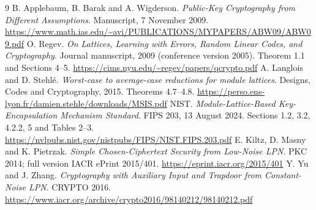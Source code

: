 \documentclass[11pt,a4paper]{article}
\begin{document}
\begin{thebibliography}{9}
 B. Applebaum, B. Barak and A. Wigderson. \emph{Public-Key Cryptography from Different Assumptions}. Manuscript, 7 November 2009.\newline
\url{https://www.math.ias.edu/~avi/PUBLICATIONS/MYPAPERS/ABW09/ABW09.pdf}
 O. Regev. \emph{On Lattices, Learning with Errors, Random Linear Codes, and Cryptography}. Journal manuscript, 2009 (conference version 2005). Theorem 1.1 and Sections 4--5.\newline
\url{https://cims.nyu.edu/~regev/papers/qcrypto.pdf}
 A. Langlois and D. Stehl\'e. \emph{Worst-case to average-case reductions for module lattices}. Designs, Codes and Cryptography, 2015. Theorems 4.7--4.8.\newline
\url{https://perso.ens-lyon.fr/damien.stehle/downloads/MSIS.pdf}
 NIST. \emph{Module-Lattice-Based Key-Encapsulation Mechanism Standard}. FIPS 203, 13 August 2024. Sections 1.2, 3.2, 4.2.2, 5 and Tables 2--3.\newline
\url{https://nvlpubs.nist.gov/nistpubs/FIPS/NIST.FIPS.203.pdf}
 E. Kiltz, D. Masny and K. Pietrzak. \emph{Simple Chosen-Ciphertext Security from Low-Noise LPN}. PKC 2014; full version IACR ePrint 2015/401.\newline
\url{https://eprint.iacr.org/2015/401}
 Y. Yu and J. Zhang. \emph{Cryptography with Auxiliary Input and Trapdoor from Constant-Noise LPN}. CRYPTO 2016.\newline
\url{https://www.iacr.org/archive/crypto2016/98140212/98140212.pdf}
\end{thebibliography}
\end{document}
